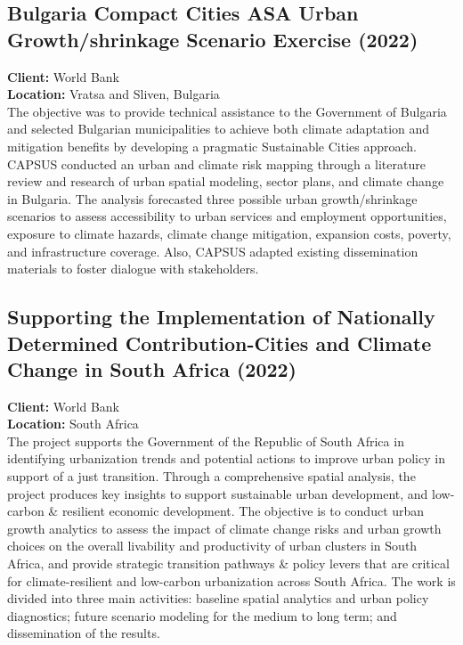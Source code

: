 \documentclass[
	a4paper,
	12pt,
	unnumberedsections,
]{CSSullivanBusinessReport}
\begin{document}
\subsection{Bulgaria Compact Cities ASA Urban Growth/shrinkage Scenario Exercise (2022)}
\textbf{Client:}  World Bank \\
\textbf{Location:}  Vratsa and Sliven, Bulgaria \\[0.5em]
 The objective was to provide technical assistance to the Government of Bulgaria and selected Bulgarian municipalities to achieve both climate adaptation and mitigation benefits by developing a pragmatic Sustainable Cities approach. CAPSUS conducted an urban and climate risk mapping through a literature review and research of urban spatial modeling, sector plans, and climate change in Bulgaria. The analysis forecasted three possible urban growth/shrinkage scenarios to assess accessibility to urban services and employment opportunities, exposure to climate hazards, climate change mitigation, expansion costs, poverty, and infrastructure coverage. Also, CAPSUS adapted existing dissemination materials to foster dialogue with stakeholders.

\subsection{Supporting the Implementation of Nationally Determined Contribution-Cities and Climate Change in South Africa (2022)}
\textbf{Client:}  World Bank \\
\textbf{Location:}  South Africa \\[0.5em]
 The project supports the Government of the Republic of South Africa in identifying urbanization trends and potential actions to improve urban policy in support of a just transition. Through a comprehensive spatial analysis, the project produces key insights to support sustainable urban development, and low-carbon \& resilient economic development. The objective is to conduct urban growth analytics to assess the impact of climate change risks and urban growth choices on the overall livability and productivity of urban clusters in South Africa, and provide strategic transition pathways \& policy levers that are critical for climate-resilient and low-carbon urbanization across South Africa. The work is divided into three main activities: baseline spatial analytics and urban policy diagnostics; future scenario modeling for the medium to long term; and dissemination of the results.
\end{document}
